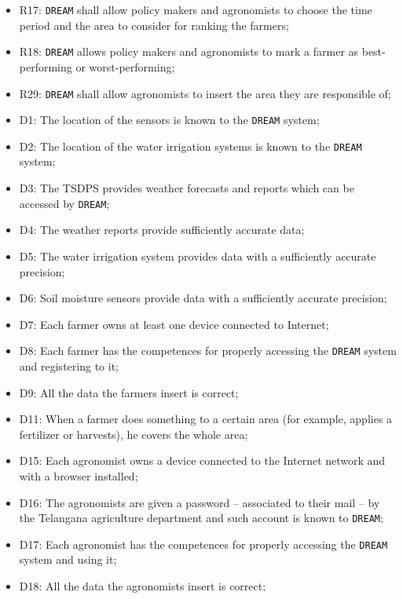 \documentclass{article}
\begin{document}
\begin{itemize}
    \item R17: \verb|DREAM| shall allow policy makers and agronomists to choose the time period and the area to consider for ranking the farmers;
    
    \item R18: \verb|DREAM| allows policy makers and agronomists to mark a farmer as best-performing or worst-performing;
    
    \item R29: \verb|DREAM| shall allow agronomists to insert the area they are responsible of;
    
    \item D1: The location of the sensors is known to the \verb|DREAM| system;
    
    \item D2: The location of the water irrigation systems is known to the \verb|DREAM| system;
    
    \item D3: The TSDPS provides weather forecasts and reports which can be accessed by \verb|DREAM|;
    
    \item D4: The weather reports provide sufficiently accurate data;
    
    \item D5: The water irrigation system provides data with a sufficiently accurate precision;
    
    \item D6: Soil moisture sensors provide data with a sufficiently accurate precision;
    
    \item D7: Each farmer owns at least one device connected to Internet;
    
    \item D8: Each farmer has the competences for properly accessing the \verb|DREAM| system and registering to it;
    
    \item D9: All the data the farmers insert is correct;
    
    \item D11: When a farmer does something to a certain area (for example, applies a fertilizer or harvests), he covers the whole area;
    
    \item D15: Each agronomist owns a device connected to the Internet network and with a browser installed;

    \item D16: The agronomists are given a password – associated to their mail – by the Telangana agriculture department and such account is known to \verb|DREAM|;

    \item D17: Each agronomist has the competences for properly accessing the \verb|DREAM| system and using it;
  
    \item D18: All the data the agronomists insert is correct;
\end{itemize}
\end{document}
